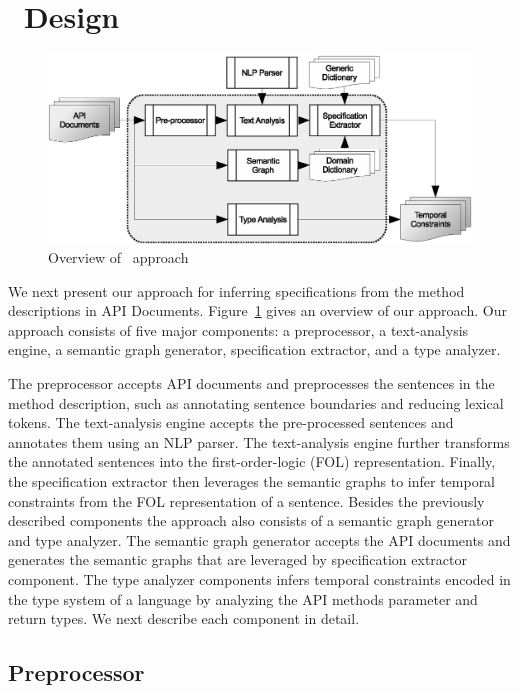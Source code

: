 \section{\tool\ Design}
\label{sec:approach}

\begin{figure}
	\centering
		\includegraphics[scale=0.45]{approach.eps}
	\caption{Overview of \tool\ approach}
	\label{fig:approachOverview}
\end{figure}

We next present our approach for inferring specifications from the method descriptions in API Documents.
Figure~\ref{fig:approachOverview} gives an overview of our approach.
Our approach consists of five major components: a preprocessor, a text-analysis engine, a semantic graph generator, specification extractor, and a type analyzer.

The preprocessor accepts API documents and preprocesses the sentences in the method description, such as annotating sentence boundaries and reducing lexical tokens.
The text-analysis engine accepts the pre-processed sentences and annotates them using an NLP parser.
The text-analysis engine further transforms the annotated sentences into the first-order-logic (FOL) representation.
Finally, the specification extractor then leverages the semantic graphs to infer temporal constraints from the FOL representation of a sentence.
Besides the previously described components the approach also consists of a semantic graph generator and type analyzer.
The semantic graph generator accepts the API documents and generates the semantic graphs that are leveraged by specification extractor component.
The type analyzer components infers temporal constraints encoded in the type system of a language by analyzing the API methods parameter and return types.
We next describe each component in detail.


\subsection{Preprocessor}
\label{sub:parser}

